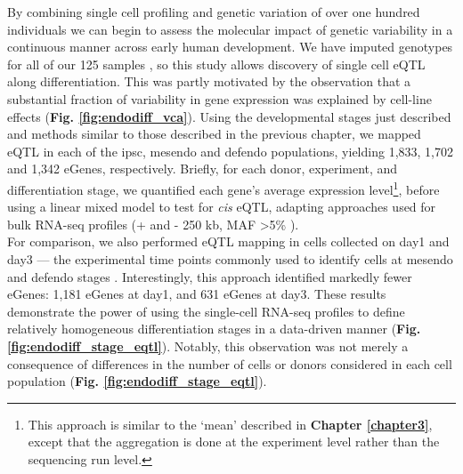 By combining single cell profiling and genetic variation of over one hundred individuals we can begin to assess the molecular impact of genetic variability in a continuous manner across early human development.
We have imputed genotypes for all of our 125 samples \cite{kilpinen2017common}, so this study allows discovery of single cell eQTL along differentiation. 
This was partly motivated by the observation that a substantial fraction of variability in gene expression was explained by cell-line effects (\textbf{Fig. \ref{fig:endodiff_vca}}).
Using the developmental stages just described and methods similar to those described in the previous chapter, we mapped eQTL in each of the \gls{ipsc}, mesendo and defendo populations, yielding 1,833, 1,702 and 1,342 eGenes, respectively. 
Briefly, for each donor, experiment, and differentiation stage, we quantified each gene’s average expression level\footnote{This approach is similar to the `mean' described in \textbf{Chapter 
\ref{chapter3}},
except that the aggregation is done at the experiment level rather than the sequencing run level.}, before using a linear mixed model to test for \textit{cis} eQTL, adapting approaches used for bulk RNA-seq profiles (+ and - 250 kb, MAF >5\% \cite{kilpinen2017common}).\\

For comparison, we also performed eQTL mapping in cells collected on day1 and day3 — the experimental time points commonly used to identify cells at mesendo and defendo stages \cite{hannan2013production}.
Interestingly, this approach identified markedly fewer eGenes: 1,181 eGenes at day1, and 631 eGenes at day3.
These results demonstrate the power of using the single-cell RNA-seq profiles to define relatively homogeneous differentiation stages in a data-driven manner (\textbf{Fig. \ref{fig:endodiff_stage_eqtl}}). 
Notably, this observation was not merely a consequence of differences in the number of cells or donors considered in each cell population (\textbf{Fig. \ref{fig:endodiff_stage_eqtl}}). \\

